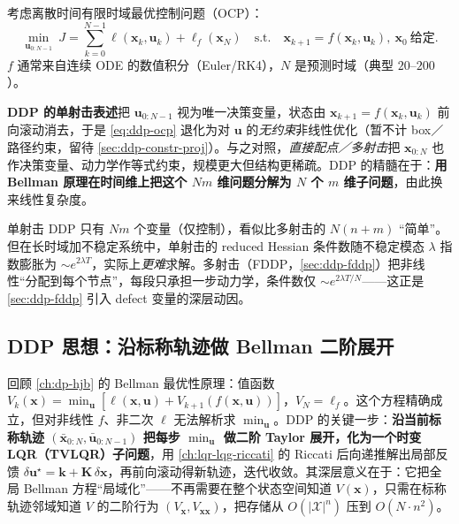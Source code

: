 考虑离散时间有限时域最优控制问题（OCP）：
\begin{equation}
  \min_{\mathbf{u}_{0:N-1}}\ J=\sum_{k=0}^{N-1}\ell(\mathbf{x}_k,\mathbf{u}_k)+\ell_f(\mathbf{x}_N)
  \quad\text{s.t.}\quad \mathbf{x}_{k+1}=f(\mathbf{x}_k,\mathbf{u}_k),\ \mathbf{x}_0\ \text{给定}.
  \label{eq:ddp-ocp}
\end{equation}
$f$ 通常来自连续 ODE 的数值积分（Euler/RK4），$N$ 是预测时域（典型 $20$--$200$）。

\textbf{DDP 的单射击表述}把 $\mathbf{u}_{0:N-1}$ 视为唯一决策变量，状态由 $\mathbf{x}_{k+1}=f(\mathbf{x}_k,\mathbf{u}_k)$ 前向滚动消去，于是 \cref{eq:ddp-ocp} 退化为对 $\mathbf{u}$ 的\emph{无约束}非线性优化（暂不计 box／路径约束，留待 \cref{sec:ddp-constr-proj}）。与之对照，\emph{直接配点／多射击}把 $\mathbf{x}_{0:N}$ 也作决策变量、动力学作等式约束，规模更大但结构更稀疏。DDP 的精髓在于：\textbf{用 Bellman 原理在时间维上把这个 $Nm$ 维问题分解为 $N$ 个 $m$ 维子问题}，由此换来线性复杂度。

\begin{pitfall}
单射击 DDP 只有 $Nm$ 个变量（仅控制），看似比多射击的 $N(n+m)$ “简单”。但在长时域加不稳定系统中，单射击的 reduced Hessian 条件数随不稳定模态 $\lambda$ 指数膨胀为 $\sim e^{2\lambda T}$，实际上\emph{更难}求解。多射击（FDDP，\cref{sec:ddp-fddp}）把非线性“分配到每个节点”，每段只承担一步动力学，条件数仅 $\sim e^{2\lambda T/N}$——这正是 \cref{sec:ddp-fddp} 引入 defect 变量的深层动因。
\end{pitfall}

\subsection{DDP 思想：沿标称轨迹做 Bellman 二阶展开}
\label{sec:ddp-idea}

回顾 \cref{ch:dp-hjb} 的 Bellman 最优性原理：值函数 $V_k(\mathbf{x})=\min_{\mathbf{u}}[\ell(\mathbf{x},\mathbf{u})+V_{k+1}(f(\mathbf{x},\mathbf{u}))]$，$V_N=\ell_f$。这个方程精确成立，但对非线性 $f$、非二次 $\ell$ 无法解析求 $\min_{\mathbf{u}}$。DDP 的关键一步：\textbf{沿当前标称轨迹 $(\bar{\mathbf{x}}_{0:N},\bar{\mathbf{u}}_{0:N-1})$ 把每步 $\min_{\mathbf{u}}$ 做二阶 Taylor 展开，化为一个时变 LQR（TVLQR）子问题}，用 \cref{ch:lqr-lqg-riccati} 的 Riccati 后向递推解出局部反馈 $\delta\mathbf{u}^\star=\mathbf{k}+\mathbf{K}\,\delta\mathbf{x}$，再前向滚动得新轨迹，迭代收敛。其深层意义在于：它把全局 Bellman 方程“局域化”——不再需要在整个状态空间知道 $V(\mathbf{x})$，只需在标称轨迹邻域知道 $V$ 的二阶行为 $(V_{\mathbf{x}},V_{\mathbf{xx}})$，把存储从 $O(|\mathcal{X}|^n)$ 压到 $O(N\cdot n^2)$。

